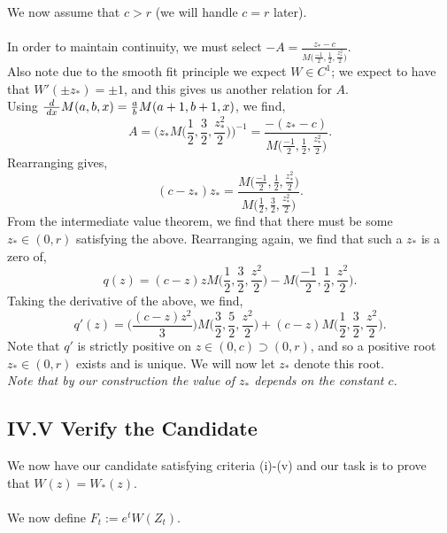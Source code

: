 \documentclass[12pt]{article}
\newcommand{\df}[1]{\hspace{2 px} d #1 \hspace{2 px}}
\theoremstyle{definition}
\begin{document}
We now assume that $c > r$ (we will handle $c = r$ later). \\
\\
In order to maintain continuity, we must select $- A = \frac{z_* - c}{M \big (\frac{-1}{2}, \frac{1}{2}, \frac{z_*^2}{2} \big )}$. \\
Also note due to the smooth fit principle we expect $W \in C^1$; we expect to have that $W'(\pm z_*) = \pm 1$, and this gives us another relation for $A$. \\
Using $\frac{d}{\df{x}} M(a,b,x) = \frac{a}{b} M(a + 1, b+1, x)$, we find,
\[
    A = \Big ( z_* M \Big (\frac{1}{2}, \frac{3}{2}, \frac{z_*^2}{2} \Big ) \Big )^{-1} = \frac{-(z_* - c)}{M \big (\frac{-1}{2}, \frac{1}{2}, \frac{z_*^2}{2} \big )}.
\]
Rearranging gives,
\[
    (c - z_*) z_* = \frac{M \big (\frac{-1}{2}, \frac{1}{2}, \frac{z^2_*}{2} \big )}{M \big (\frac{1}{2},\frac{3}{2},\frac{z_*^2}{2} \big )}.
\]
From the intermediate value theorem, we find that there must be some $z_* \in (0, r)$ satisfying the above.
Rearranging again, we find that such a $z_*$ is a zero of,
\[
    q(z) = (c - z)z M \Big ( \frac{1}{2},\frac{3}{2},\frac{z^2}{2} \Big ) - M \Big (\frac{-1}{2},\frac{1}{2},\frac{z^2}{2} \Big ).
\]
Taking the derivative of the above, we find,
\[
    q'(z) = \Big ( \frac{(c - z)z^2}{3} \Big ) M \Big (\frac{3}{2},\frac{5}{2},\frac{z^2}{2} \Big ) + (c - z) M \Big ( \frac{1}{2},\frac{3}{2},\frac{z^2}{2} \Big ).
\]
Note that $q'$ is strictly positive on $z \in (0, c) \supset (0, r)$, and so a positive root $z_* \in (0, r)$ exists and is unique. We will now let $z_*$ denote this root. \\

\textit{Note that by our construction the value of $z_*$ depends on the constant $c$.}

\subsection*{IV.V Verify the Candidate}\label{sec:IV.V}
We now have our candidate satisfying criteria (i)-(v) and our task is to prove that $W(z) = W_*(z)$. \\
\\
We now define $F_t := e^t W(Z_t)$. \\
\end{document}
